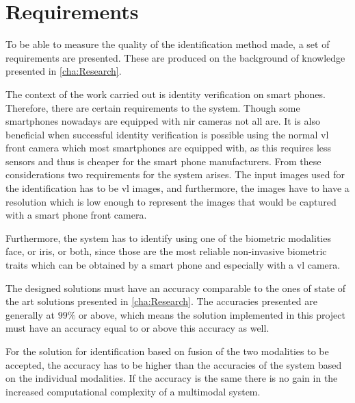 \chapter{Requirements}\label{ch:req}\glsresetall
To be able to measure the quality of the identification method made, a set of requirements are presented. These are produced on the background of knowledge presented in \autoref{cha:Research}.

The context of the work carried out is identity verification on smart phones. Therefore, there are certain requirements to the system. Though some smartphones nowadays are equipped with \gls{nir} cameras not all are. It is also beneficial when successful identity verification is possible using the normal \gls{vl} front camera which most smartphones are equipped with, as this requires less sensors and thus is cheaper for the smart phone manufacturers. From these considerations two requirements for the system arises. The input images used for the identification has to be \gls{vl} images, and furthermore, the images have to have a resolution which is low enough to represent the images that would be captured with a smart phone front camera.

Furthermore, the system has to identify using one of the biometric modalities face, or iris, or both, since those are the most reliable non-invasive biometric traits which can be obtained by a smart phone and especially with a \gls{vl} camera. 

The designed solutions must have an accuracy comparable to the ones of state of the art solutions presented in \autoref{cha:Research}. The accuracies presented are generally at $99\%$ or above, which means the solution implemented in this project must have an accuracy equal to or above this accuracy as well. 

For the solution for identification based on fusion of the two modalities to be accepted, the accuracy has to be higher than the accuracies of the system based on the individual modalities. If the accuracy is the same there is no gain in the increased computational complexity of a multimodal system. 

